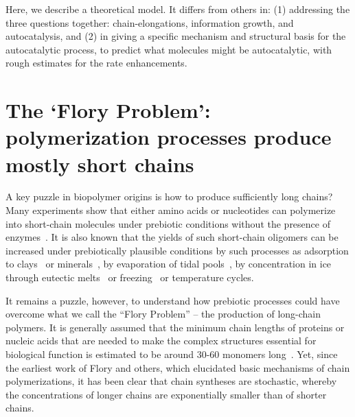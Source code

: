 \documentclass[journal=jacsat,manuscript=article,layout=twocolumn]{achemso}
\begin{document}
  Here, we describe a theoretical model.  It differs from others in: (1) addressing the three 
questions together: chain-elongations, information growth, and autocatalysis, and (2) in giving a 
specific mechanism and structural basis for the autocatalytic process, to predict what molecules 
might be autocatalytic, with rough estimates for the rate enhancements.
 
 \section{The `Flory Problem': polymerization processes produce mostly short chains}
 \label{sec:flory} 

A key puzzle in biopolymer origins is how to produce sufficiently long chains?  Many experiments 
show that either amino acids or nucleotides can polymerize into short-chain molecules under 
prebiotic conditions without the presence of 
enzymes~\cite{Shock1992,Martin1998,PAECHT-HOROWITZ1970,Leman2004a,Orgel2004}.  It is also known 
that 
the yields of such short-chain oligomers can be increased under prebiotically plausible conditions 
by such processes as adsorption to clays~\cite{Rao1980,Lambert2008} or 
minerals~\cite{Bernal1949,Ferris1996}, by evaporation of tidal pools~\cite{Nelson2001}, by 
concentration in ice through eutectic melts~\cite{Kanavarioti2001} or freezing~\cite{Bada2004} or 
temperature cycles. 

It remains a puzzle, however, to understand how prebiotic processes could have overcome what 
we call the ``Flory Problem'' -- the production of long-chain polymers.  It is generally assumed 
that the minimum chain lengths of proteins or nucleic acids that are needed to make the complex 
structures essential for biological function is estimated to be around 30-60 monomers 
long~\cite{Szostak1993}.  Yet, since the earliest work of Flory and others, which elucidated basic 
mechanisms of chain polymerizations, it has been clear that chain syntheses are stochastic, 
whereby 
the concentrations of longer chains are exponentially smaller than of shorter chains. 
\end{document}
